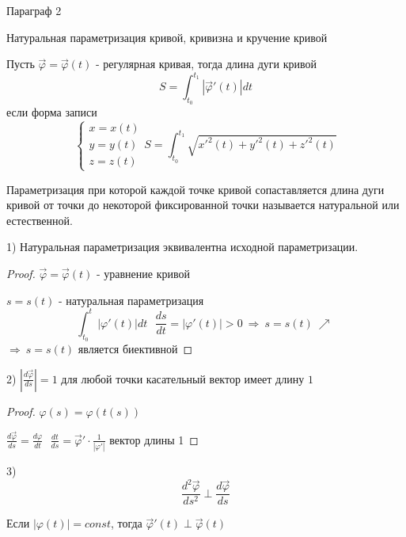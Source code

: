 \begin{title}
  Параграф 2
\end{title}

\begin{title}[\Large]
  Натуральная параметризация кривой, кривизна и кручение кривой
\end{title}

Пусть $\vec \varphi = \vec \varphi(t)$ - регулярная кривая, тогда длина дуги
кривой
$$
S = \int_{t_0}^{t_1} | \vec \varphi'(t)| dt
$$
если форма записи
$$
\left\{
\begin{array}{c}
  x = x(t) \\
  y = y(t) \\
  z = z(t)
\end{array}
\right.
S = \int_{t_0}^{t_1} \sqrt{ x'^2(t) + y'^2(t) + z'^2(t)}
$$

\begin{define}
  Параметризация при которой каждой точке кривой сопаставляется длина дуги
  кривой от точки до некоторой фиксированной точки называется натуральной или
  естественной.
\end{define}

\begin{block}[Свойства]
  1) Натуральная параметризация эквивалентна исходной параметризации.

  \begin{proof}
    $\vec \varphi = \vec \varphi(t)$ - уравнение кривой

    $s = s(t)$ - натуральная параметризация
    $$
    \int_{t_0}^{t} |\varphi'(t)| dt ~~~
    \frac{ds}{dt} = |\varphi'(t)| > 0 ~ \Rightarrow ~ s = s(t) ~ \nearrow ~
    $$
    $\Rightarrow ~ s = s(t)$ является биективной
  \end{proof}

  2) $\left| \frac{d \vec \varphi}{ds} \right| = 1$ для любой точки касательный
  вектор имеет длину $1$

  \begin{proof}
    $\varphi(s) = \varphi (t(s))$

    $\frac{d\vec \varphi}{ds} = \frac{d\varphi}{dt} ~~~ \frac{dt}{ds} =
    \vec \varphi' \cdot \frac{1}{|\varphi'|}$ вектор длины 1
  \end{proof}

  3)
  $$
  \frac{d^2 \vec \varphi}{ds^2} \perp \frac{d\vec \varphi}{ds}
  $$
\end{block}

\begin{block}[Лемма]
  Если $|\varphi(t)| = const$, тогда $\vec \varphi'(t) \perp
  \vec \varphi(t)$
\end{block}

